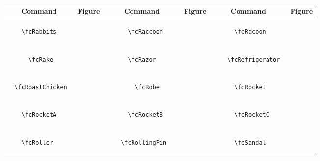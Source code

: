 \documentclass[x11names]{article}
\begin{document}
\begin{table}[H]\centering\begin{tabular}{|c|c|c|c|c|c|}\hline{\bf Command} & {\bf Figure} & {\bf Command} & {\bf Figure} & {\bf Command} & {\bf Figure}\\	\hline	&\multirow{5}{*}{	\fcRabbits	[scale=0.4]} & &\multirow{5}{*}{	\fcRaccoon	[scale=0.4]} & &\multirow{5}{*}{	\fcRacoon	[scale=0.4]}\\	& & & & & \\	& & & & & \\	\verb|	\fcRabbits	| & & \verb|	\fcRaccoon	| & & \verb|	\fcRacoon	| & \\	& & & & & \\	& & & & & \\	& & & & & \\	\hline									
		&\multirow{5}{*}{	\fcRake	[scale=0.4]} & &\multirow{5}{*}{	\fcRazor	[scale=0.4]} & &\multirow{5}{*}{	\fcRefrigerator	[scale=0.4]}\\	& & & & & \\	& & & & & \\	\verb|	\fcRake	| & & \verb|	\fcRazor	| & & \verb|	\fcRefrigerator	| & \\	& & & & & \\	& & & & & \\	& & & & & \\	\hline									
		&\multirow{5}{*}{	\fcRoastChicken	[scale=0.4]} & &\multirow{5}{*}{	\fcRobe	[scale=0.8]} & &\multirow{5}{*}{	\fcRocket	[scale=0.4]}\\	& & & & & \\	& & & & & \\	\verb|	\fcRoastChicken	| & & \verb|	\fcRobe	| & & \verb|	\fcRocket	| & \\	& & & & & \\	& & & & & \\	& & & & & \\	\hline									
		&\multirow{5}{*}{	\fcRocketA	[scale=0.4]} & &\multirow{5}{*}{	\fcRocketB	[scale=0.4]} & &\multirow{5}{*}{	\fcRocketC	[scale=0.4]}\\	& & & & & \\	& & & & & \\	\verb|	\fcRocketA	| & & \verb|	\fcRocketB	| & & \verb|	\fcRocketC	| & \\	& & & & & \\	& & & & & \\	& & & & & \\	\hline									
		&\multirow{5}{*}{	\fcRoller	[scale=0.4]} & &\multirow{5}{*}{	\fcRollingPin	[scale=0.4]} & &\multirow{5}{*}{	\fcSandal	[scale=0.8]}\\	& & & & & \\	& & & & & \\	\verb|	\fcRoller	| & & \verb|	\fcRollingPin	| & & \verb|	\fcSandal	| & \\	& & & & & \\	& & & & & \\	& & & & & \\	\hline									

\end{tabular}
\end{table}
\end{document}
